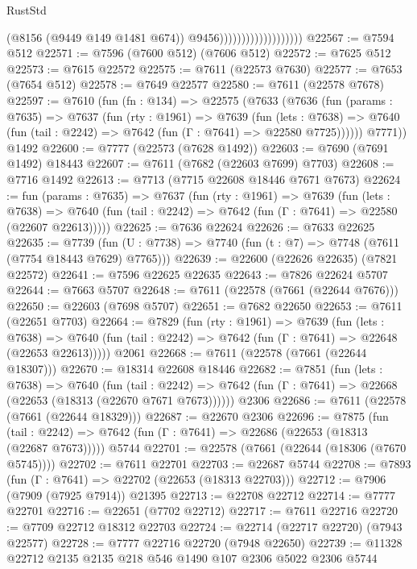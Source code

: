 \begin{lexlean}{RustStd}
\begin{coremodule}
{\begin{coremodule}
{{{{{{{{{{{{{{{{{{{{{{{{{{{{{{{{{{                                          (@8156 (@9449 @149 @1481 @674))
                                          @9456)))))))))))))))))))
@22567 := @7594 @512
@22571 := @7596 (@7600 @512) (@7606 @512)
@22572 := @7625 @512
@22573 := @7615 @22572
@22575 := @7611 (@22573 @7630)
@22577 := @7653 (@7654 @512)
@22578 := @7649 @22577
@22580 := @7611 (@22578 @7678)
@22597 := @7610
    (fun (fn : @134) =>
    @22575
      (@7633
        (@7636
          (fun (params : @7635) =>
          @7637
            (fun (rty : @1961) =>
            @7639
              (fun (lets : @7638) =>
              @7640 (fun (tail : @2242) => @7642 (fun (Γ : @7641) => @22580 @7725))))))
        @7771))
    @1492
@22600 := @7777 (@22573 (@7628 @1492))
@22603 := @7690 (@7691 @1492) @18443
@22607 := @7611 (@7682 (@22603 @7699) @7703)
@22608 := @7716 @1492
@22613 := @7713 (@7715 @22608 @18446 @7671 @7673)
@22624 := fun (params : @7635) =>
  @7637
    (fun (rty : @1961) =>
    @7639
      (fun (lets : @7638) =>
      @7640 (fun (tail : @2242) => @7642 (fun (Γ : @7641) => @22580 (@22607 @22613)))))
@22625 := @7636 @22624
@22626 := @7633 @22625
@22635 := @7739
    (fun (U : @7738) => @7740 (fun (t : @7) => @7748 (@7611 (@7754 @18443 @7629) @7765)))
@22639 := @22600 (@22626 @22635) (@7821 @22572)
@22641 := @7596 @22625 @22635
@22643 := @7826 @22624 @5707
@22644 := @7663 @5707
@22648 := @7611 (@22578 (@7661 (@22644 @7676)))
@22650 := @22603 (@7698 @5707)
@22651 := @7682 @22650
@22653 := @7611 (@22651 @7703)
@22664 := @7829
    (fun (rty : @1961) =>
    @7639
      (fun (lets : @7638) =>
      @7640 (fun (tail : @2242) => @7642 (fun (Γ : @7641) => @22648 (@22653 @22613)))))
    @2061
@22668 := @7611 (@22578 (@7661 (@22644 @18307)))
@22670 := @18314 @22608 @18446
@22682 := @7851
    (fun (lets : @7638) =>
    @7640
      (fun (tail : @2242) =>
      @7642 (fun (Γ : @7641) => @22668 (@22653 (@18313 (@22670 @7671 @7673))))))
    @2306
@22686 := @7611 (@22578 (@7661 (@22644 @18329)))
@22687 := @22670 @2306
@22696 := @7875
    (fun (tail : @2242) => @7642 (fun (Γ : @7641) => @22686 (@22653 (@18313 (@22687 @7673)))))
    @5744
@22701 := @22578 (@7661 (@22644 (@18306 (@7670 @5745))))
@22702 := @7611 @22701
@22703 := @22687 @5744
@22708 := @7893 (fun (Γ : @7641) => @22702 (@22653 (@18313 @22703)))
@22712 := @7906 (@7909 (@7925 @7914)) @21395
@22713 := @22708 @22712
@22714 := @7777 @22701
@22716 := @22651 (@7702 @22712)
@22717 := @7611 @22716
@22720 := @7709 @22712 @18312 @22703
@22724 := @22714 (@22717 @22720) (@7943 @22577)
@22728 := @7777 @22716 @22720 (@7948 @22650)
@22739 := @11328 @22712 @2135 @2135 @218 @546 @1490 @107 @2306 @5022 @2306 @5744
}}}}}}}}}}}}}}}}}}}}}}}}}}}}}}}}}}
\end{coremodule}}
\end{coremodule}
\end{lexlean}

